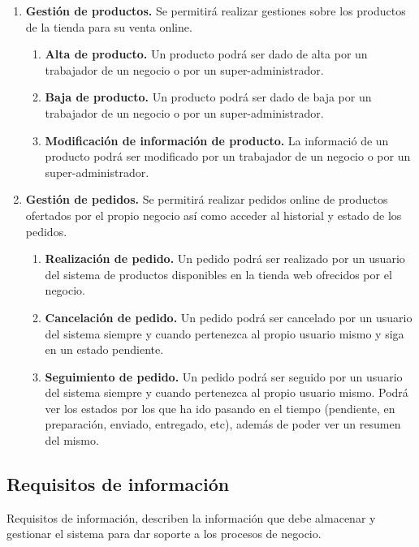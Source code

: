 \begin{enumerate}[leftmargin=1.75cm,start=1,label={\bfseries RF-\arabic*.}]
    \item \textbf{Gestión de productos.} Se permitirá realizar gestiones sobre los productos de la tienda para su venta online.
    \begin{enumerate}[start=1,label={\bfseries RF-5.\arabic*.}]
        \item \textbf{Alta de producto.} Un producto podrá ser dado de alta por un trabajador de un negocio o por un super-administrador.
        \item \textbf{Baja de producto.} Un producto podrá ser dado de baja por un trabajador de un negocio o por un super-administrador.
        \item \textbf{Modificación de información de producto.} La informació de un producto podrá ser modificado por un trabajador de un negocio o por un super-administrador.
    \end{enumerate}
    
    \item \textbf{Gestión de pedidos.} Se permitirá realizar pedidos online de productos ofertados por el propio negocio así como acceder al historial y estado de los pedidos.
    \begin{enumerate}[start=1,label={\bfseries RF-6.\arabic*.}]
        \item \textbf{Realización de pedido.} Un pedido podrá ser realizado por un usuario del sistema de productos disponibles en la tienda web ofrecidos por el negocio.
        \item \textbf{Cancelación de pedido.} Un pedido podrá ser cancelado por un usuario del sistema siempre y cuando pertenezca al propio usuario mismo y siga en un estado pendiente.
        \item \textbf{Seguimiento de pedido.} Un pedido podrá ser seguido por un usuario del sistema siempre y cuando pertenezca al propio usuario mismo. Podrá ver los estados por los que ha ido pasando en el tiempo (pendiente, en preparación, enviado, entregado, etc), además de poder ver un resumen del mismo.
    \end{enumerate}
\end{enumerate}

\subsection{Requisitos de información}

Requisitos de información, describen la información que debe almacenar y gestionar el sistema para dar soporte a los
procesos de negocio.

